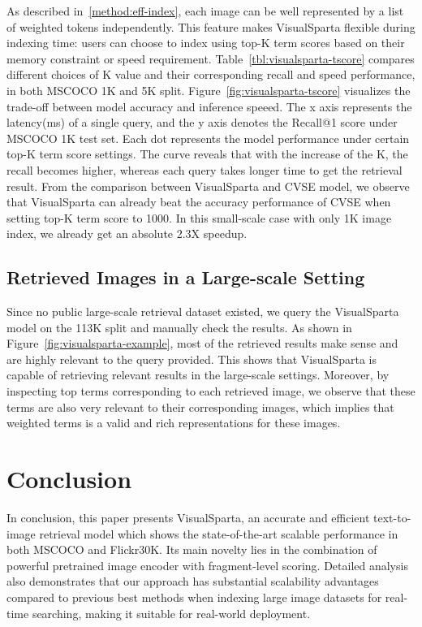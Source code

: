 \documentclass[11pt,a4paper]{article}
\begin{document}
As described in~\ref{method:eff-index}, each image can be well represented by a list of weighted tokens independently. This feature makes VisualSparta flexible during indexing time: users can choose to index using top-K term scores based on their memory constraint or speed requirement. Table~\ref{tbl:visualsparta-tscore} compares different choices of K value and their corresponding recall and speed performance, in both MSCOCO 1K and 5K split. Figure~\ref{fig:visualsparta-tscore} visualizes the trade-off between model accuracy and inference speeed. The x axis represents the latency(ms) of a single query, and the y axis denotes the Recall@1 score under MSCOCO 1K test set. Each dot represents the model performance under certain top-K term score settings. The curve reveals that with the increase of the K, the recall becomes higher, whereas each query takes longer time to get the retrieval result. From the comparison between VisualSparta and CVSE model, we observe that VisualSparta can already beat the accuracy performance of CVSE when setting top-K term score to 1000. In this small-scale case with only 1K image index, we already get an absolute 2.3X speedup. 




\subsection{Retrieved Images in a Large-scale Setting}


Since no public large-scale retrieval dataset existed, we query the VisualSparta model on the 113K split and manually check the results. As shown in Figure~\ref{fig:visualsparta-example}, most of the retrieved results make sense and are highly relevant to the query provided. This shows that VisualSparta is capable of retrieving relevant results in the large-scale settings. Moreover, by inspecting top terms corresponding to each retrieved image, we observe that these terms are also very relevant to their corresponding images, which implies that weighted terms is a valid and rich representations for these images. 





 
\section{Conclusion}
In conclusion, this paper presents VisualSparta, an accurate and efficient text-to-image retrieval model which shows the state-of-the-art scalable performance in both MSCOCO and Flickr30K. 
Its main novelty lies in the combination of powerful pretrained image encoder with fragment-level scoring. Detailed analysis also demonstrates that our approach has substantial scalability advantages compared to previous best methods when indexing large image datasets for real-time searching, making it suitable for real-world deployment.

 
























\end{document}
